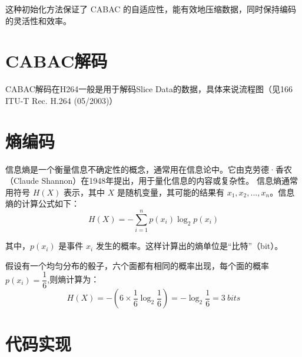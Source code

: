 \documentclass{/Users/hi/Study/template/code}
\begin{document}
这种初始化方法保证了 CABAC 的自适应性，能有效地压缩数据，同时保持编码的灵活性和效率。


\newpage
\section{CABAC解码}
CABAC解码在H264一般是用于解码Slice Data的数据，具体来说流程图（见166 ITU-T Rec. H.264 (05/2003)）


\newpage
\section{熵编码}
\begin{definition}
	信息熵是一个衡量信息不确定性的概念，通常用在信息论中。它由克劳德·香农（Claude Shannon）在1948年提出，用于量化信息的内容或复杂性。
	信息熵通常用符号 \( H(X) \) 表示，其中 \( X \) 是随机变量，其可能的结果有 \( x_1, x_2, ..., x_n \)。信息熵的计算公式如下：
	\begin{equation}
		H( X ) = - \sum_{i=1}^{n} p( x_i  ) \log_2 p( x_i )
	\end{equation}
\end{definition}
其中，\( p(x_i) \) 是事件 \( x_i \) 发生的概率。这样计算出的熵单位是“比特”（bit）。

假设有一个均匀分布的骰子，六个面都有相同的概率出现，每个面的概率 \( p(x_i) = \dfrac{1}{6} \),则熵计算为：
\begin{equation}
	H(X) = -\left(6 \times \frac{1}{6} \log_2 \frac{1}{6}\right) = -\log_2 \frac{1}{6} = 3 ~ bits
\end{equation}

\newpage
\section{代码实现}
\end{document}
